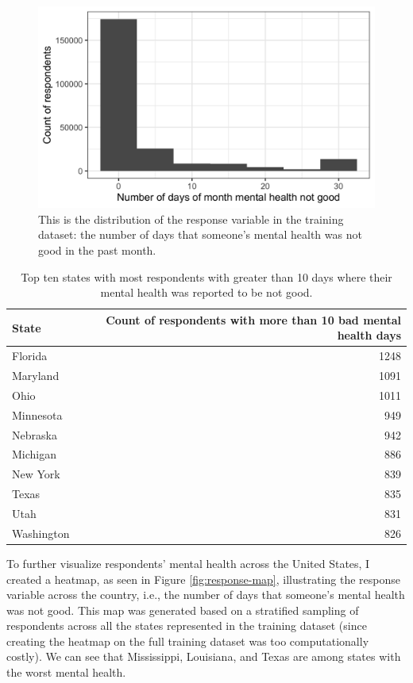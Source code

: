 \documentclass[
]{article}
\begin{document}
\begin{figure}[H]

{\centering \includegraphics[width=0.8\linewidth]{../results/response-histogram} 

}

\caption{This is the distribution of the response variable in the training dataset: the number of days that someone's mental health was not good in the past month.}\label{fig:response-histogram}
\end{figure}

\begin{table}[H]

\caption{\label{tab:top-10-states-num-10-mental-health-bad-days}Top ten states with most respondents with greater than 10 days where their mental health was reported to be not good.}
\centering
\begin{tabular}[t]{lr}
\toprule
State & Count of respondents with more than 
                      10 bad mental health days\\
\midrule
Florida & 1248\\
Maryland & 1091\\
Ohio & 1011\\
Minnesota & 949\\
Nebraska & 942\\
\addlinespace
Michigan & 886\\
New York & 839\\
Texas & 835\\
Utah & 831\\
Washington & 826\\
\bottomrule
\end{tabular}
\end{table}

To further visualize respondents' mental health across the United States, I created a heatmap, as seen in Figure \ref{fig:response-map}, illustrating the response variable across the country, i.e., the number of days that someone's mental health was not good. This map was generated based on a stratified sampling of respondents across all the states represented in the training dataset (since creating the heatmap on the full training dataset was too computationally costly). We can see that Mississippi, Louisiana, and Texas are among states with the worst mental health.
\end{document}
